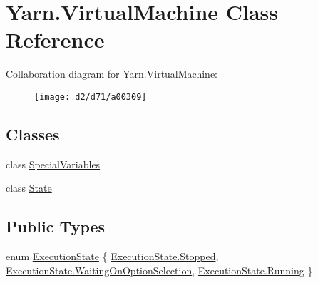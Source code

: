 \hypertarget{a00072}{\section{Yarn.\-Virtual\-Machine Class Reference}
\label{a00072}
}


Collaboration diagram for Yarn.\-Virtual\-Machine\-:
\nopagebreak
\begin{figure}[H]
\begin{center}
\leavevmode
\texttt{[image: d2/d71/a00309]}
\end{center}
\end{figure}
\subsection*{Classes}
\begin{DoxyCompactItemize}
\item 
class \hyperlink{a00072_d0/d48/a00165}{Special\-Variables}
\item 
class \hyperlink{a00075}{State}
\end{DoxyCompactItemize}
\subsection*{Public Types}
\begin{DoxyCompactItemize}
\item 
enum \hyperlink{a00072_add28fa9c8a45ca579e84d05920bbc42d}{Execution\-State} \{ \hyperlink{a00072_add28fa9c8a45ca579e84d05920bbc42dac23e2b09ebe6bf4cb5e2a9abe85c0be2}{Execution\-State.\-Stopped}, 
\hyperlink{a00072_add28fa9c8a45ca579e84d05920bbc42da74a2a0b3a4597e7a50714f9cea34772b}{Execution\-State.\-Waiting\-On\-Option\-Selection}, 
\hyperlink{a00072_add28fa9c8a45ca579e84d05920bbc42da5bda814c4aedb126839228f1a3d92f09}{Execution\-State.\-Running}
 \}
\end{DoxyCompactItemize}
